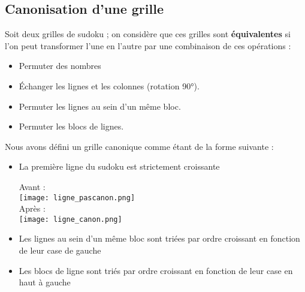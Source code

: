 \documentclass[a4paper]{article}
\begin{document}
\subsection{Canonisation d'une grille}
\begin{justify}
    Soit deux grilles de sudoku ; on considère que ces grilles sont \textbf{équivalentes} si l'on peut transformer l'une en l'autre par une combinaison de ces opérations : 
    \begin{itemize}
        \item Permuter des nombres
        \item Échanger les lignes et les colonnes (rotation 90°).
        \item Permuter les lignes au sein d'un même bloc.
        \item Permuter les blocs de lignes.
    \end{itemize}

    \noindent Nous avons défini un grille canonique comme étant de la forme suivante :
    \begin{itemize}
    \item La première ligne du sudoku est strictement croissante

    \begin{center}
        Avant :
        \\
        \texttt{[image: ligne\_pascanon.png]}
        \\
        Après :
        \\
        \texttt{[image: ligne\_canon.png]}
    \end{center}

    \newpage
    
    \item Les lignes au sein d'un même bloc sont triées par ordre croissant en fonction de leur case de gauche
    \item Les blocs de ligne sont triés par ordre croissant en fonction de leur case en haut à gauche \\
    \end{itemize}
    

\end{justify}
\end{document}
